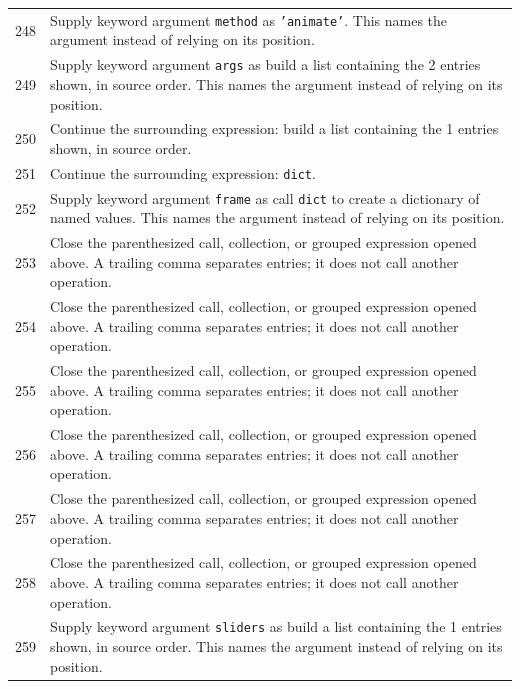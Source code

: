 \documentclass[11pt,a4paper]{book}
\begin{document}
\begin{longtable}{r p{}}
248 & Supply keyword argument \texttt{method} as \texttt{'animate'}. This names the argument instead of relying on its position. \\

249 & Supply keyword argument \texttt{args} as build a list containing the 2 entries shown, in source order. This names the argument instead of relying on its position. \\

250 & Continue the surrounding expression: build a list containing the 1 entries shown, in source order. \\

251 & Continue the surrounding expression: \texttt{dict}. \\

252 & Supply keyword argument \texttt{frame} as call \texttt{dict} to create a dictionary of named values. This names the argument instead of relying on its position. \\

253 & Close the parenthesized call, collection, or grouped expression opened above. A trailing comma separates entries; it does not call another operation. \\

254 & Close the parenthesized call, collection, or grouped expression opened above. A trailing comma separates entries; it does not call another operation. \\

255 & Close the parenthesized call, collection, or grouped expression opened above. A trailing comma separates entries; it does not call another operation. \\

256 & Close the parenthesized call, collection, or grouped expression opened above. A trailing comma separates entries; it does not call another operation. \\

257 & Close the parenthesized call, collection, or grouped expression opened above. A trailing comma separates entries; it does not call another operation. \\

258 & Close the parenthesized call, collection, or grouped expression opened above. A trailing comma separates entries; it does not call another operation. \\

259 & Supply keyword argument \texttt{sliders} as build a list containing the 1 entries shown, in source order. This names the argument instead of relying on its position. \\


\end{longtable}
\end{document}
